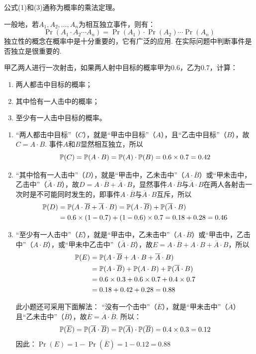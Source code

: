 公式(1)和(3)通称为概率的乘法定理。

一般地，若$A_1,A_2,\ldots,A_n$为相互独立事件，则有：
\begin{equation}
    \Pr(A_1\cdot A_2\cdots A_n)=\Pr(A_1)\cdot \Pr(A_2)\cdots \Pr(A_n)\tag{4}
\end{equation}
独立性的概念在概率中是十分重要的，它有广泛的应用. 在实际问题中判断事件是否独立是很重要的.

\begin{example}
    甲乙两人进行一次射击，如果两人射中目标的概率甲为0.6，乙为0.7，计算：
\begin{enumerate}[(1)]
\item 两人都击中目标的概率；
\item 其中恰有一人击中的概率；
\item 至少有一人击中目标的概率。
\end{enumerate}
\end{example}

\begin{solution}
\begin{enumerate}[(1)]
    \item “两人都击中目标”（$C$），就是“甲击中目标”（$A$），且“乙击中目标”（$B$），故$C=A\cdot B$. 事件$A$和$B$显然相互独立，所以
  \[  \mathbb{P}(C)=\mathbb{P}(A\cdot B)=\mathbb{P}(A)\cdot \mathbb{P}(B)=0.6\times0.7=0.42\]
    \item “其中恰有一人击中”（$D$），就是“甲击中，乙未击中”（$A\cdot \overline{B}$）或“甲未击中，乙击中”（$\overline{A}\cdot B$），故$D=A\cdot \overline{B}+\overline{A}\cdot B$，显然事件$A\cdot \overline{B}$与$\overline{A}\cdot B$在两人各射击一次时是不可能同时发生的，即事件$A\cdot \overline{B}$与$\overline{A}\cdot B$互斥，所以
\[\begin{split}
    \mathbb{P}(D)&=\mathbb{P}(A\cdot \overline{B}+\overline{A}\cdot B)=\mathbb{P}(A\cdot \overline{B})+\mathbb{P}(\overline{A}\cdot B)\\
    &=0.6\times(1-0.7)+(1-0.6)\times 0.7=0.18+0.28=0.46
\end{split}\]
    \item “至少有一人击中”（$E$），就是“甲击中，乙未击中”（$A\cdot \overline{B}$）或“甲击中，乙击中”（${A}\cdot B$），或“甲未中乙击中”（$\overline{A}\cdot B$），故$E=A\cdot \overline{B}+A\cdot B+\overline{A}\cdot B$，所以
\[\begin{split}
    \mathbb{P}(E) &= \mathbb{P}(A\cdot \overline{B}+A\cdot B+\overline{A}\cdot B)\\
    &=\mathbb{P}(A\cdot \overline{B})+\mathbb{P}(A\cdot B)+\mathbb{P}(\overline{A}\cdot B)\\
    &=0.6\times0.3+0.6\times0.7+0.4\times0.7\\
&=0.18+0.42+0.28=0.88
\end{split}\]

此小题还可采用下面解法：
“没有一个击中”（$\overline{E}$），就是“甲未击中”（$\overline{A}$）且“乙未击中”（$\overline{B}$），故$\overline{E}=\overline{A}\cdot \overline{B}$. 所以：
$$\mathbb{P}(\overline{E})=\mathbb{P}(\overline{A}\cdot \overline{B})=\mathbb{P}(\overline{A})\cdot\mathbb{P}(\overline{B})=0.4\times0.3=0.12$$
因此：$\Pr(E)=1-\Pr(\overline{E})=1-0.12=0.88$
\end{enumerate}
\end{solution}

